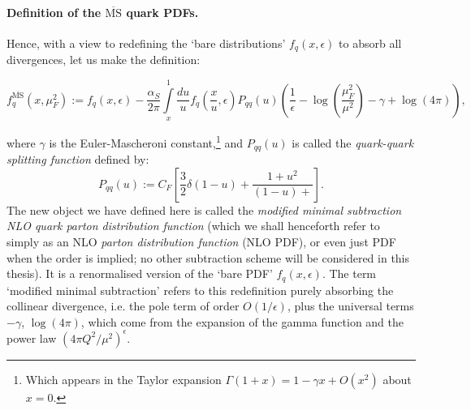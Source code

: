 \documentclass[withindex,glossary]{cam-thesis}
\begin{document}
\paragraph{Definition of the $\overline{\text{MS}}$ quark PDFs.} Hence, with a view to redefining the `bare distributions' $f_q(x,\epsilon)$ to absorb all divergences, let us make the definition:
\begin{framed}
\begin{equation}
\label{eq:pdf_definition}
f_q^{\overline{\text{MS}}}(x, \mu_F^2) := f_q(x,\epsilon) - \frac{\alpha_S}{2\pi} \int\limits_{x}^{1} \frac{du}{u} f_q\left( \frac{x}{u},\epsilon\right) P_{qq}(u) \left( \frac{1}{\epsilon} - \log\left( \frac{\mu_F^2}{\mu^2} \right) - \gamma + \log(4\pi) \right),
\end{equation}
\end{framed}
\noindent where $\gamma$ is the Euler-Mascheroni constant,\footnote{Which appears in the Taylor expansion $\Gamma(1+x) = 1 - \gamma x + O(x^2)$ about $x=0$.} and $P_{qq}(u)$ is called the \textit{quark-quark splitting function} defined by:
\begin{equation}
P_{qq}(u) := C_F \left[ \frac{3}{2} \delta(1-u) + \frac{1+u^2}{(1-u)+} \right].
\end{equation} 
\noindent The new object we have defined here is called the \textit{modified minimal subtraction NLO quark parton distribution function} (which we shall henceforth refer to simply as an NLO \textit{parton distribution function} (NLO PDF), or even just PDF when the order is implied; no other subtraction scheme will be considered in this thesis). It is a renormalised version of the `bare PDF' $f_q(x,\epsilon)$. The term `modified minimal subtraction' refers to this redefinition purely absorbing the collinear divergence, i.e. the pole term of order $O(1/\epsilon)$, plus the universal terms $-\gamma$, $\log(4\pi)$, which come from the expansion of the gamma function and the power law $(4\pi Q^2/\mu^2)^{\epsilon}$.
\end{document}
